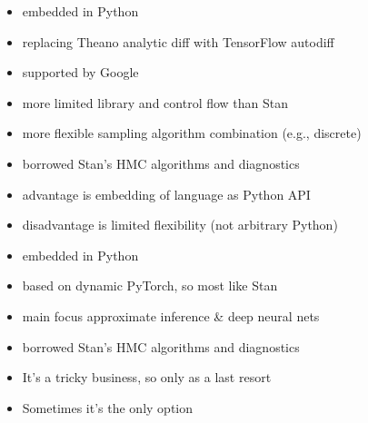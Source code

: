 \documentclass[10pt]{report}
\begin{document}
\begin{itemize}
\item embedded in Python
\item replacing Theano analytic diff with TensorFlow autodiff
\item supported by Google
\item more limited library and control flow than Stan
\item more flexible sampling algorithm combination (e.g., discrete)
\item borrowed Stan's HMC algorithms and diagnostics
\item {advantage} is {embedding of language} as Python API
\item {disadvantage} is {limited flexibility} (not arbitrary Python)
\end{itemize}

\begin{itemize}
\item embedded in Python
\item based on dynamic PyTorch, so most like Stan
\item main focus approximate inference \& deep neural nets
\item borrowed Stan's HMC algorithms and diagnostics
\end{itemize}

\begin{itemize}
\item It's a tricky business, so only as a last resort
\item Sometimes it's the only option
\end{itemize}
\end{document}
